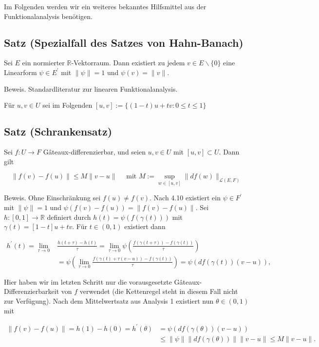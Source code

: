 \documentclass[10pt, letterpaper]{article}
\begin{document}
Im Folgenden werden wir ein weiteres bekanntes Hilfsmittel aus der Funktionalanalysis benötigen.

\subsection*{Satz (Spezialfall des Satzes von Hahn-Banach)}

Sei $E$ ein normierter $\mathbb{R}$-Vektorraum. Dann existiert zu jedem $v \in E \backslash\{0\}$ eine Linearform $\psi \in E^{\prime}$ mit $\|\psi\|=1$ und $\psi(v)=\|v\|$.

Beweis. Standardliteratur zur linearen Funktionalanalysis.

Für $u, v \in U$ sei im Folgenden $[u, v]:=\{(1-t) u+t v: 0 \leq t \leq 1\}$

\subsection*{Satz (Schrankensatz)}

Sei $f: U \rightarrow F$ Gâteaux-differenzierbar, und seien $u, v \in U$ mit $[u, v] \subset U$. Dann gilt

$$
\|f(v)-f(u)\| \leq M\|v-u\| \quad \text { mit } M:=\sup _{w \in[u, v]}\|d f(w)\|_{\mathcal{L}(E, F)}
$$

Beweis. Ohne Einschränkung sei $f(u) \neq f(v)$. Nach 4.10 existiert ein $\psi \in F^{\prime}$ mit $\|\psi\|=1$ und $\psi(f(v)-f(u))=\|f(v)-f(u)\|$. Sei $h:[0,1] \rightarrow \mathbb{R}$ definiert durch $h(t)=\psi(f(\gamma(t)))$ mit $\gamma(t)=[1-t] u+t v$. Für $t \in(0,1)$ existiert dann

$$
\begin{aligned}
h^{\prime}(t)=\lim _{\tau \rightarrow 0} & \frac{h(t+\tau)-h(t)}{\tau}=\lim _{\tau \rightarrow 0} \psi\left(\frac{f(\gamma(t+\tau))-f(\gamma(t))}{\tau}\right) \\
& =\psi\left(\lim _{\tau \rightarrow 0} \frac{f(\gamma(t)+\tau(v-u))-f(\gamma(t))}{\tau}\right)=\psi(d f(\gamma(t))(v-u)),
\end{aligned}
$$

Hier haben wir im letzten Schritt nur die vorausgesetzte Gâteaux-Differenzierbarkeit von $f$ verwendet (die Kettenregel steht in diesem Fall nicht zur Verfügung). Nach dem Mittelwertsatz aus Analysis 1 existiert nun $\theta \in(0,1)$ mit

$$
\begin{aligned}
\|f(v)-f(u)\|=h(1)-h(0)=h^{\prime}(\theta) & =\psi(d f(\gamma(\theta))(v-u)) \\
& \leq\|\psi\|\|d f(\gamma(\theta))\|\|v-u\| \leq M\|v-u\| .
\end{aligned}
$$
\end{document}
